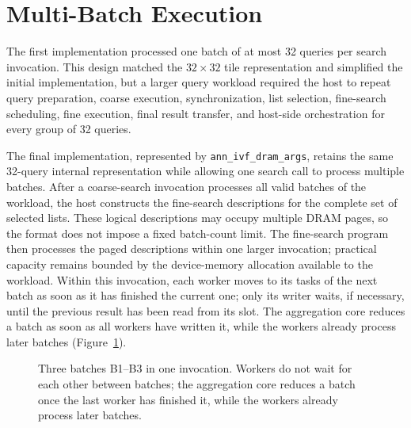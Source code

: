 \section{Multi-Batch Execution}
\label{sec:multi-batch-execution}

The first implementation processed one batch of at most 32 queries per search invocation. This design matched the \(32\times32\) tile representation and simplified the initial implementation, but a larger query workload required the host to repeat query preparation, coarse execution, synchronization, list selection, fine-search scheduling, fine execution, final result transfer, and host-side orchestration for every group of 32 queries.

The final implementation, represented by \texttt{ann\_ivf\_dram\_args}, retains the same 32-query internal representation while allowing one search call to process multiple batches. After a coarse-search invocation processes all valid batches of the workload, the host constructs the fine-search descriptions for the complete set of selected lists. These logical descriptions may occupy multiple DRAM pages, so the format does not impose a fixed batch-count limit. The fine-search program then processes the paged descriptions within one larger invocation; practical capacity remains bounded by the device-memory allocation available to the workload. Within this invocation, each worker moves to its tasks of the next batch as soon as it has finished the current one; only its writer waits, if necessary, until the previous result has been read from its slot. The aggregation core reduces a batch as soon as all workers have written it, while the workers already process later batches (Figure~\ref{fig:example-multibatch}).

\begin{figure}[htbp]
\centering
{}
\caption{Three batches B1--B3 in one invocation. Workers do not wait for each
other between batches; the aggregation core reduces a batch once the last
worker has finished it, while the workers already process later batches.}
\label{fig:example-multibatch}
\end{figure}

